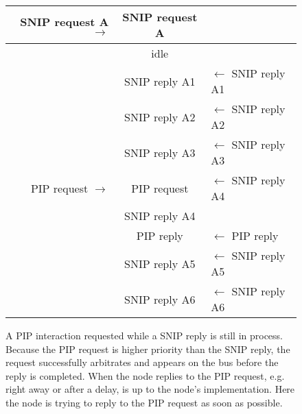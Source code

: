 \documentclass[11pt]{article}
\begin{document}
\begin{figure}[!htbp]
\begin{center}
\begin{tabular}{ r | c | l}
\hline
SNIP request A $\rightarrow$ & SNIP request A & \\ \hline

    & idle & \\ \hline

    & SNIP reply A1  & $\leftarrow$ SNIP reply A1 \\ \hline
    & SNIP reply A2  & $\leftarrow$ SNIP reply A2 \\ \hline
    & SNIP reply A3  & $\leftarrow$ SNIP reply A3 \\ \hline
PIP request $\rightarrow$ & PIP request & $\leftarrow$ SNIP reply A4\\ \hline
    & SNIP reply A4  & \\ \hline
    & PIP reply  & $\leftarrow$ PIP reply \\ \hline
    & SNIP reply A5  & $\leftarrow$ SNIP reply A5 \\ \hline
    & SNIP reply A6  & $\leftarrow$ SNIP reply A6 \\ \hline
\end{tabular}
\end{center}
\caption{A PIP interaction requested while a SNIP reply is still in process.
Because the PIP request is higher priority than the SNIP reply, the request
successfully arbitrates and appears on the bus before the reply is completed.
When the node replies to the PIP request, e.g. right away or after a delay, 
is up to the node's implementation.
Here the node is trying to reply to the PIP request
as soon as possible.}
\label{fig:normal_SNIP_PIP_interaction_w_reply}
\end{figure}
\end{document}
